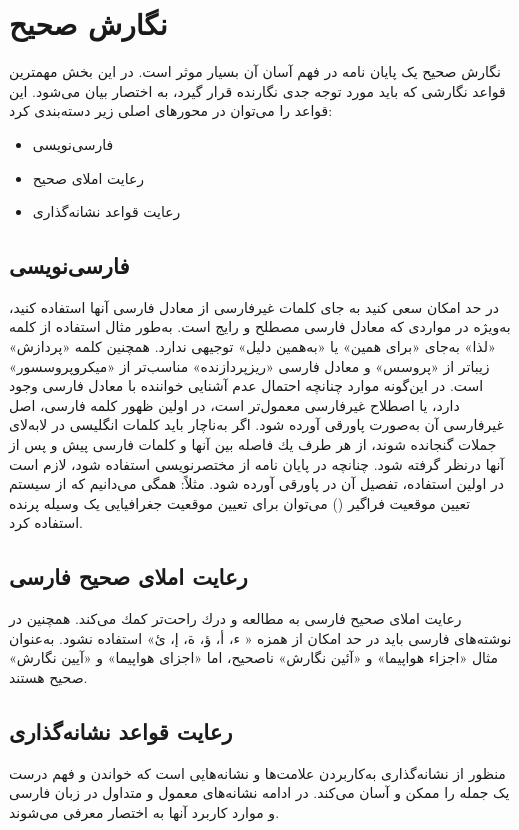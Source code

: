 \section{نگارش صحیح}
نگارش صحیح یک پایان نامه در فهم آسان آن بسیار موثر است. در این بخش مهمترین قواعد نگارشی که باید مورد توجه جدی نگارنده قرار گیرد، به اختصار بیان می‌شود. این قواعد را می‌توان در محورهای اصلی زیر دسته‌بندی کرد: 
\begin{itemize}
	\item 
	فارسی‌نویسی
	\item
	رعایت املای صحیح
	\item
	رعایت قواعد نشانه‌گذاری
\end{itemize}
\subsection{فارسی‌نویسی}
در حد امكان سعی كنید به جای كلمات غیر‌فارسی از معادل فارسی آنها استفاده كنید، به‌ویژه در مواردی كه معادل فارسی مصطلح و رایج است‌.‌ به‌طور مثال استفاده از كلمه «لذا» به‌جای «برای همین» یا «به‌همین دلیل» توجیهی ندارد‌. همچنین كلمه «پردازش» زیباتر از «پروسس» و معادل فارسی «ریز‌پردازنده» مناسب‌تر از «میكروپروسسور» است‌.‌ در این‌گونه موارد چنانچه احتمال عدم آشنایی خواننده با معادل فارسی وجود دارد، یا اصطلاح غیر‌فارسی معمول‌تر است، در اولین ظهور كلمه فارسی، اصل غیر‌فارسی آن به‌صورت پاورقی آورده شود‌.‌ اگر به‌ناچار باید كلمات انگلیسی در لابه‌لای جملات گنجانده شوند، از هر طرف یك فاصله بین آنها و كلمات فارسی پیش و پس از آنها در‌نظر گرفته شود‌.‌ چنانچه در پایان نامه از مختصر‌نویسی  
استفاده شود، لازم است در اولین استفاده، تفصیل آن در پاورقی آورده شود‌.‌ 
مثلاً: همگی می‌دانیم که از سیستم تعیین موقعیت فراگیر 
()
می‌توان برای تعیین موقعیت جغرافیایی یک وسیله پرنده استفاده کرد.
\subsection{رعایت املای صحیح فارسی}
رعایت املای صحیح فارسی به مطالعه و درك راحت‌تر كمك می‌كند. همچنین در نوشته‌های فارسی باید در حد امكان از همزه « ء، أ، ؤ، ة، إ، ئ» استفاده نشود‌.‌ به‌عنوان مثال «اجزاء هواپیما» و «آئین نگارش» ناصحیح، اما «اجزای هواپیما» و «آیین نگارش» صحیح هستند.‌
\subsection{رعایت قواعد نشانه‌گذاری}
منظور از نشانه‌گذاری به‌كار‌بردن علامت‌ها و نشانه‌هایی است كه خواندن و فهم درست یک جمله را ممکن و آسان می‌كند. در ادامه نشانه‌های معمول و متداول در زبان فارسی و موارد کاربرد آنها به اختصار معرفی می‌شوند.

